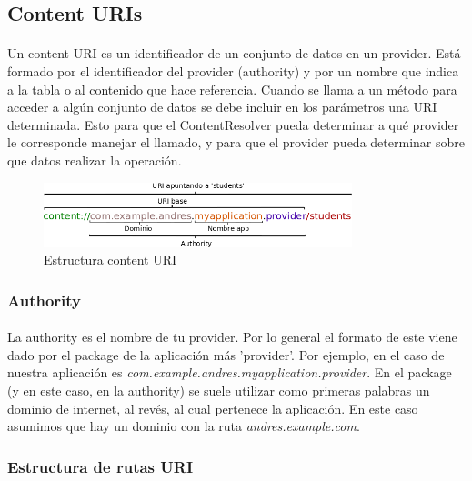 \documentclass[10pt]{extarticle}
\begin{document}
\subsection{Content URIs}

\paragraph{}
Un content URI es un identificador de un conjunto de datos en un provider. Está formado por el identificador del provider (authority) y por un nombre que indica a la tabla o al contenido que hace referencia. Cuando se llama a un método para acceder a algún conjunto de datos se debe incluir en los parámetros una URI determinada. Esto para que el ContentResolver pueda determinar a qué provider le corresponde manejar el llamado, y para que el provider pueda determinar sobre que datos realizar la operación.

\begin{figure}[H]
    \centering
    \includegraphics[width=0.8\textwidth]{provider_uri_explicacion.png}
    \caption{Estructura content URI}
    \label{fig:estructura_content_URI}
\end{figure}



\subsubsection{Authority}

\paragraph{}
La authority es el nombre de tu provider. Por lo general el formato de este viene dado por el package de la aplicación más 'provider'. Por ejemplo, en el caso de nuestra aplicación es \textit{com.example.andres.myapplication.provider}. En el package (y en este caso, en la authority) se suele utilizar como primeras palabras un dominio de internet, al revés, al cual pertenece la aplicación. En este caso asumimos que hay un dominio con la ruta \textit{andres.example.com}.

\subsubsection{Estructura de rutas URI}
\end{document}
